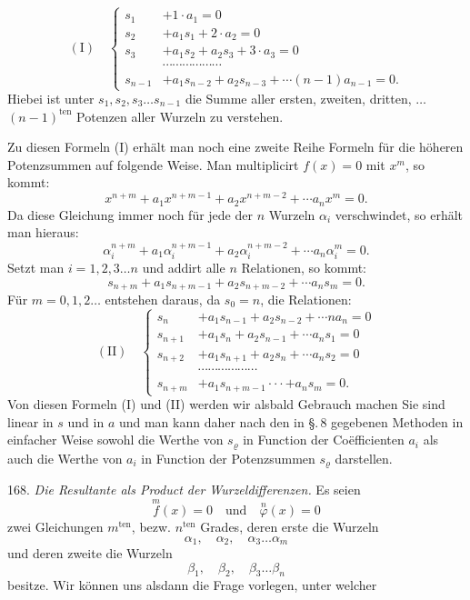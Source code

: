 \documentclass[11pt]{article}
\providecommand{\weberpage}[1]{}
\begin{document}
\weberpage{179}
\[
(\mathrm{I}) \quad
\left\{
\begin{aligned}
s_1 &+ 1 \cdot a_1 = 0 \\
s_2 &+ a_1 s_1 + 2 \cdot a_2 = 0 \\
s_3 &+ a_1 s_2 + a_2 s_3 + 3 \cdot a_3 = 0 \\
& \cdots\cdots\cdots\cdots\cdots\cdots \\
s_{n-1} &+ a_1 s_{n-2} + a_2 s_{n-3} + \cdots (n-1) a_{n-1} = 0.
\end{aligned}
\right.
\]
Hiebei ist unter $s_1, s_2, s_3 \ldots s_{n-1}$ die Summe aller ersten, zweiten,
dritten, $\ldots$ $(n-1)^{\mathrm{ten}}$ Potenzen aller Wurzeln zu verstehen.

Zu diesen Formeln (I) erhält man noch eine zweite Reihe Formeln für die
höheren Potenzsummen auf folgende Weise. Man multiplicirt $f(x) = 0$ mit
$x^m$, so kommt:
\[
x^{n+m} + a_1 x^{n+m-1} + a_2 x^{n+m-2} + \cdots a_n x^m = 0.
\]
Da diese Gleichung immer noch für jede der $n$ Wurzeln $\alpha_i$
verschwindet, so erhält man hieraus:
\[
\alpha_i^{n+m} + a_1 \alpha_i^{n+m-1} + a_2 \alpha_i^{n+m-2} + \cdots a_n \alpha_i^m = 0.
\]
Setzt man $i = 1, 2, 3 \ldots n$ und addirt alle $n$ Relationen, so kommt:
\[
s_{n+m} + a_1 s_{n+m-1} + a_2 s_{n+m-2} + \cdots a_n s_m = 0.
\]
Für $m = 0, 1, 2 \ldots$ entstehen daraus, da $s_0 = n$, die Relationen:
\[
(\mathrm{II}) \quad
\left\{
\begin{aligned}
s_n &+ a_1 s_{n-1} + a_2 s_{n-2} + \cdots n a_n = 0 \\
s_{n+1} &+ a_1 s_n + a_2 s_{n-1} + \cdots a_n s_1 = 0 \\
s_{n+2} &+ a_1 s_{n+1} + a_2 s_n + \cdots a_n s_2 = 0 \\
& \cdots\cdots\cdots\cdots\cdots\cdots \\
s_{n+m} &+ a_1 s_{n+m-1} \cdot\cdot\cdot + a_n s_m = 0.
\end{aligned}
\right.
\]
Von diesen Formeln (I) und (II) werden wir alsbald Gebrauch machen
Sie sind linear in $s$ und in $a$ und man kann daher nach den in \S.\,8
gegebenen Methoden in einfacher Weise sowohl die Werthe von $s_\varrho$ in
Function der Coëfficienten $a_i$ als auch die Werthe von $a_i$ in Function
der Potenzsummen $s_\varrho$ darstellen.

168. \textit{Die Resultante als Product der Wurzeldifferenzen.} Es seien
\[
\overset{m}{f}(x) = 0 \quad \text{und} \quad \overset{n}{\varphi}(x) = 0
\]
zwei Gleichungen $m^{\mathrm{ten}}$, bezw. $n^{\mathrm{ten}}$ Grades, deren
erste die Wurzeln
\[
\alpha_1, \quad \alpha_2, \quad \alpha_3 \ldots \alpha_m
\]
und deren zweite die Wurzeln
\[
\beta_1, \quad \beta_2, \quad \beta_3 \ldots \beta_n
\]
besitze. Wir können uns alsdann die Frage vorlegen, unter welcher
\end{document}
